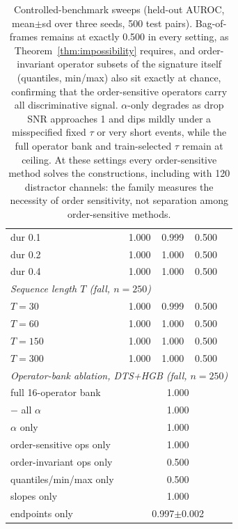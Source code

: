 \begin{table}[h]
\begin{tabular}{lcccc}
dur 0.1 & 1.000 & 0.999 & 0.500 \\
dur 0.2 & 1.000 & 1.000 & 0.500 \\
dur 0.4 & 1.000 & 1.000 & 0.500 \\
\midrule
\multicolumn{4}{l}{\emph{Sequence length $T$ (fall, $n{=}250$)}} \\
$T{=}30$ & 1.000 & 0.999 & 0.500 \\
$T{=}60$ & 1.000 & 1.000 & 0.500 \\
$T{=}150$ & 1.000 & 1.000 & 0.500 \\
$T{=}300$ & 1.000 & 1.000 & 0.500 \\
\midrule
\multicolumn{5}{l}{\emph{Operator-bank ablation, DTS+HGB (fall, $n{=}250$)}} \\
full 16-operator bank & \multicolumn{4}{c}{1.000} \\
$-$ all $\alpha$ & \multicolumn{4}{c}{1.000} \\
$\alpha$ only & \multicolumn{4}{c}{1.000} \\
order-sensitive ops only & \multicolumn{4}{c}{1.000} \\
order-invariant ops only & \multicolumn{4}{c}{0.500} \\
quantiles/min/max only & \multicolumn{4}{c}{0.500} \\
slopes only & \multicolumn{4}{c}{1.000} \\
endpoints only & \multicolumn{4}{c}{0.997{\scriptsize$\pm$0.002}} \\
\bottomrule
\end{tabular}
\caption{Controlled-benchmark sweeps (held-out AUROC, mean$\pm$sd over three seeds, 500 test pairs). Bag-of-frames remains at exactly 0.500 in every setting, as Theorem~\ref{thm:impossibility} requires, and order-invariant operator subsets of the signature itself (quantiles, min/max) also sit exactly at chance, confirming that the order-sensitive operators carry all discriminative signal. $\alpha$-only degrades as drop SNR approaches 1 and dips mildly under a misspecified fixed $\tau$ or very short events, while the full operator bank and train-selected $\tau$ remain at ceiling. At these settings every order-sensitive method solves the constructions, including with 120 distractor channels: the family measures the necessity of order sensitivity, not separation among order-sensitive methods.}
\label{tab:benchsweeps}
\end{table}
